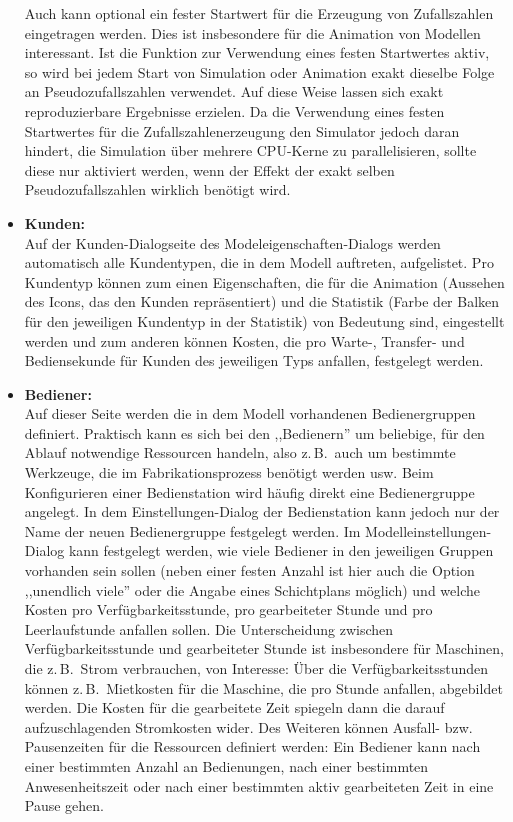 \documentclass[deutsch]{svmono}
\begin{document}
\begin{itemize}
Auch kann optional ein fester Startwert für die Erzeugung von Zufallszahlen eingetragen werden. Dies ist insbesondere für die Animation von Modellen interessant. Ist die Funktion zur Verwendung eines festen Startwertes aktiv, so wird bei jedem Start von Simulation oder Animation exakt dieselbe Folge an Pseudozufallszahlen verwendet. Auf diese Weise lassen sich exakt reproduzierbare Ergebnisse erzielen. Da die Verwendung eines festen Startwertes für die Zufallszahlenerzeugung den Simulator jedoch daran hindert, die Simulation über mehrere CPU-Kerne zu parallelisieren, sollte diese nur aktiviert werden, wenn der Effekt der exakt selben Pseudozufallszahlen wirklich benötigt wird.
\item
\textbf{Kunden:}\\
Auf der Kunden-Dialogseite des Modeleigenschaften-Dialogs werden automatisch alle Kundentypen, die in dem Modell auftreten, aufgelistet. Pro Kundentyp können zum einen Eigenschaften, die für die Animation (Aussehen des Icons, das den Kunden repräsentiert) und die Statistik (Farbe der Balken für den jeweiligen Kundentyp in der Statistik) von Bedeutung sind, eingestellt werden und zum anderen können Kosten, die pro Warte-, Transfer- und Bediensekunde für Kunden des jeweiligen Typs anfallen, festgelegt werden.
\item
\textbf{Bediener:}\\
Auf dieser Seite werden die in dem Modell vorhandenen Bedienergruppen definiert. Praktisch kann es sich bei den ,,Bedienern'' um beliebige, für den Ablauf notwendige Ressourcen handeln, also z.\,B.\ auch um bestimmte Werkzeuge, die im Fabrikationsprozess benötigt werden usw. Beim Konfigurieren einer Bedienstation wird häufig direkt eine Bedienergruppe angelegt. In dem Einstellungen-Dialog der Bedienstation kann jedoch nur der Name der neuen Bedienergruppe festgelegt werden. Im Modelleinstellungen-Dialog kann festgelegt werden, wie viele Bediener in den jeweiligen Gruppen vorhanden sein sollen (neben einer festen Anzahl ist hier auch die Option ,,unendlich viele'' oder die Angabe eines Schichtplans möglich) und welche Kosten pro Verfügbarkeitsstunde, pro gearbeiteter Stunde und pro Leerlaufstunde anfallen sollen. Die Unterscheidung zwischen Verfügbarkeitsstunde und gearbeiteter Stunde ist insbesondere für Maschinen, die z.\,B.\ Strom verbrauchen, von Interesse: Über die Verfügbarkeitsstunden können z.\,B.\ Mietkosten für die Maschine, die pro Stunde anfallen, abgebildet werden. Die Kosten für die gearbeitete Zeit spiegeln dann die darauf aufzuschlagenden Stromkosten wider. Des Weiteren können Ausfall- bzw. Pausenzeiten für die Ressourcen definiert werden: Ein Bediener kann nach einer bestimmten Anzahl an Bedienungen, nach einer bestimmten Anwesenheitszeit oder nach einer bestimmten aktiv gearbeiteten Zeit in eine Pause gehen.

\end{itemize}
\end{document}
